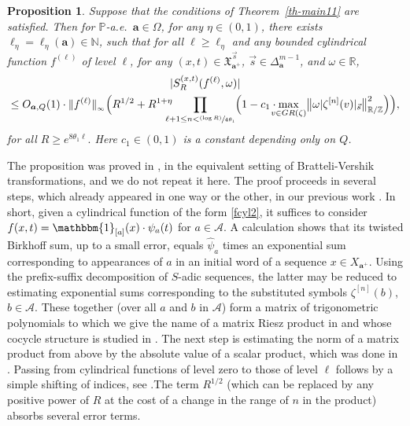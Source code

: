 \documentclass[JEP,XML,SOM,Unicode]{cedram}
\let\mathcal\mathscr
\newcommand{\One}{\mathbbm{1}}
\newcommand{\psfrac}[2]{\sfrac{(#1)}{#2}}
\theoremstyle{plain}
\newtheorem{prop}[theorem]{Proposition}
\theoremstyle{definition}
\newcommand\bom{{\boldsymbol a}}\let\ba\bom
\let\om\omega
\let\Om\Omega
\newcommand\Xx{\mathfrak{X}}
\newcommand\Ak{\mathcal{A}}
\newcommand{\R}{\mathbb{R}}
\newcommand{\Z}{\mathbb{Z}}
\newcommand{\N}{\mathbb{N}}
\renewcommand{\P}{\mathbb{P}}
\begin{document}
\begin{prop} \label{prop-Dioph4} Suppose that the conditions of Theorem~\ref{th-main11} are satisfied. Then
for $\P$-a.e.\ $\bom\in \Om$,
for any $\eta\in (0,1)$, there exists $\ell_\eta=\ell_\eta(\bom)\in \N$, such that
for all $\ell\ge \ell_\eta$ and any bounded cylindrical function $f^{(\ell)}$ of level $\ell$,
for any $(x,t)\in \Xx_{\bom^+}^{\vec{s}}$, $\vec s\in \Delta_\bom^{m-1}$, and $\om\in \R$,
\begin{multline}
\label{eq-Dioph3}
|S^{(x,t)}_R(f^{(\ell)},\om)|\\
\le O_{\bom,Q}(1)\cdot \|f^{(\ell)}\|_{_\infty} \Bigl(R^{1/2}+ R^{1+\eta}\!\!\!\!\!\prod_{\ell+1\le n < \psfrac{\log R}{4\theta_1}}
\Bigl( 1 - c_1\cdot \!\!\!\! \max_{v\in GR(\zeta)}\bigl\| \om|\zeta^{[n]}(v)|_{\vec{s}}\bigr\|^2_{\R/\Z}\Bigr)\Bigr),
\end{multline}
for all
$
R\ge e^{8\theta_1 \ell}.
$
Here $c_1\in (0,1)$ is a constant depending only on $Q$.
\end{prop}

The proposition was proved in \cite[Prop.\,7.1]{BuSo18a}, in the equivalent setting of Bratteli-Vershik transformations, and we do not repeat it here. The proof proceeds in several steps, which already appeared in one way or the other, in our previous work \cite{BuSol2,BuSo18a,BuSo19}.
In short, given a cylindrical function of the form \eqref{fcyl2}, it suffices to consider $f(x,t)=\One_{[a]}(x) \cdot \psi_a(t)$ for $a\in \Ak$. A calculation shows that its twisted Birkhoff sum, up to a small error, equals $\widehat{\psi}_a$ times an exponential sum corresponding to appearances of $a$ in an initial word of a sequence $x\in X_{\bom^+}$. Using the prefix-suffix decomposition of $S$-adic sequences, the latter may be reduced to estimating exponential sums corresponding to the substituted symbols $\zeta^{[n]}(b)$, $b\in \Ak$. These together (over all $a$ and $b$ in $\Ak$) form a matrix of trigonometric polynomials to which we give the name of a matrix Riesz product in
\cite[\S3.2]{BuSo18a} and whose cocycle structure is studied in \cite{BuSo19}. The next step is estimating the norm of a matrix product from above by the absolute value of a scalar product, which was done in \cite[Prop.\,3.4]{BuSo18a}. Passing from cylindrical functions of level zero to those of level $\ell$ follows by a simple shifting of indices, see \cite[\S3.5]{BuSo18a}.The term $R^{1/2}$ (which can be replaced by any positive power of $R$ at the cost of a change in the range of $n$ in the product) absorbs several error terms.
\end{document}

